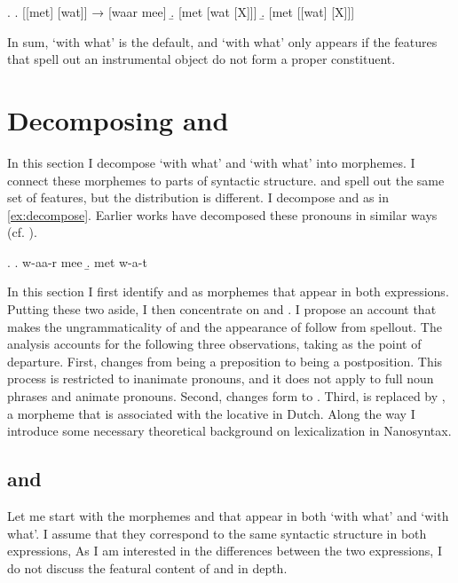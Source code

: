 \documentclass[11pt,a4paper]{article}
\begin{document}
\ex.\label{ex:summaryconst}
\a. [[met] [wat]] → [waar mee]\label{ex:waar meefr}
\b. [met [wat [X]]]\label{ex:metwatx}
\b. [met [[wat] [X]]]\label{ex:metwatfr}

In sum,  `with what' is the default, and  `with what' only appears if the features that spell out an instrumental object do not form a proper constituent.

\section{Decomposing  and }\label{sec:takingapart}

In this section I decompose  `with what' and  `with what' into morphemes. I connect these morphemes to parts of syntactic structure.  and  spell out the same set of features, but the distribution is different. I decompose  and  as in \ref{ex:decompose}. Earlier works have decomposed these pronouns in similar ways (cf. \citealt{hachem2015,noonan2017dutch,wesseling2018}).

\ex.\label{ex:decompose}
\a. w-aa-r mee
\b. met w-a-t

In this section I first identify  and  as morphemes that appear in both expressions. Putting these two aside, I then concentrate on  and .
I propose an account that makes the ungrammaticality of  and the appearance of  follow from spellout. The analysis accounts for the following three observations, taking  as the point of departure. First,  changes from being a preposition to being a postposition. This process is restricted to inanimate pronouns, and it does not apply to full noun phrases and animate pronouns. Second,  changes form to . Third,  is replaced by , a morpheme that is associated with the locative in Dutch.
Along the way I introduce some necessary theoretical background on lexicalization in Nanosyntax.

\subsection{ and }

Let me start with the morphemes  and  that appear in both  `with what' and  `with what'. I assume that they correspond to the same syntactic structure in both expressions, As I am interested in the differences between the two expressions, I do not discuss the featural content of  and  in depth.
\end{document}
